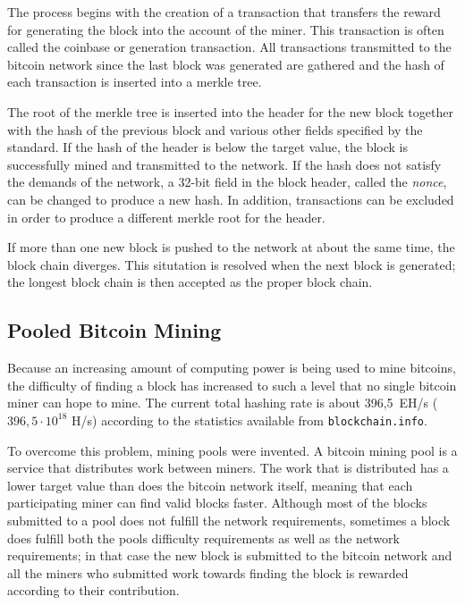 The process begins with the creation of a transaction that transfers the reward for generating the block
into the account of the miner. This transaction is often called the coinbase or generation transaction.
All transactions transmitted to the bitcoin network since the last block was generated are gathered and
the hash of each transaction is inserted into a merkle tree.

The root of the merkle tree is inserted into the header for the new block together with the hash of the
previous block and various other fields specified by the standard. If the hash of the header is below the
target value, the block is successfully mined and transmitted to the network. If the hash does not satisfy
the demands of the network, a 32-bit field in the block header, called the \textit{nonce}, can be changed
to produce a new hash. In addition, transactions can be excluded in order to produce a different merkle
root for the header.

If more than one new block is pushed to the network at about the same time, the block chain diverges.
This situtation is resolved when the next block is generated; the longest block chain is then accepted
as the proper block chain. \cite{bitcoin}

\subsection{Pooled Bitcoin Mining}

Because an increasing amount of computing power is being used to mine bitcoins, the difficulty of finding
a block has increased to such a level that no single bitcoin miner can hope to mine. The current total
hashing rate is about 396,5~EH/s ($396,5\cdot 10^{18}$ H/s) according to the statistics available from
\texttt{blockchain.info}.

To overcome this problem, mining pools were invented. A bitcoin mining pool is a service that distributes
work between miners. The work that is distributed has a lower target value than does the bitcoin network
itself, meaning that each participating miner can find valid blocks faster. Although most of the blocks
submitted to a pool does not fulfill the network requirements, sometimes a block does fulfill both the
pools difficulty requirements as well as the network requirements; in that case the new block is
submitted to the bitcoin network and all the miners who submitted work towards finding the block
is rewarded according to their contribution.

